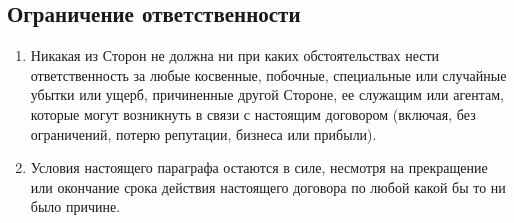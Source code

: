 \begin{Form}
    \section{Ограничение ответственности}\label{sec:9}
        \begin{enumerate}[label=\thesection.\arabic*.]
         \item Никакая из Сторон  не должна ни при каких обстоятельствах нести ответственность за любые косвенные,
               побочные, специальные или случайные убытки или ущерб, причиненные другой Стороне, ее служащим или агентам,
               которые могут возникнуть в связи с настоящим договором (включая, без ограничений, потерю репутации, бизнеса
               или прибыли).
         \item Условия настоящего параграфа остаются в силе, несмотря на прекращение или окончание срока действия
               настоящего договора по любой какой бы то ни было причине.
        \end{enumerate}


\end{Form}
